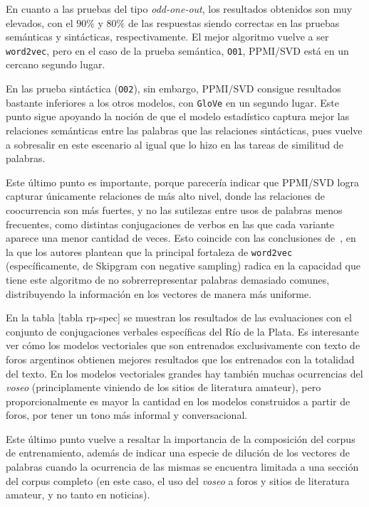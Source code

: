 En cuanto a las pruebas del tipo \textit{odd-one-out}, los resultados obtenidos son muy elevados,
con el $90\%$ y $80\%$ de las respuestas siendo correctas en las pruebas semánticas y sintácticas,
respectivamente. El mejor algoritmo vuelve a ser \texttt{word2vec}, pero en el caso de la prueba
semántica, \texttt{O01}, PPMI/SVD está en un cercano segundo lugar.

En las prueba sintáctica (\texttt{O02}), sin embargo, PPMI/SVD consigue resultados bastante
inferiores a los otros modelos, con \texttt{GloVe} en un segundo lugar. Este punto sigue apoyando la
noción de que el modelo estadístico captura mejor las relaciones semánticas entre las palabras que
las relaciones sintácticas, pues vuelve a sobresalir en este escenario al igual que lo hizo en las
tareas de similitud de palabras.

Este último punto es importante, porque parecería indicar que PPMI/SVD logra capturar únicamente
relaciones de más alto nivel, donde las relaciones de coocurrencia son más fuertes, y no las
sutilezas entre usos de palabras menos frecuentes, como distintas conjugaciones de verbos en las que
cada variante aparece una menor cantidad de veces. Esto coincide con las conclusiones
de~\cite{Levy2014a}, en la que los autores plantean que la principal fortaleza de \texttt{word2vec}
(específicamente, de Skipgram con negative sampling) radica en la capacidad que tiene este algoritmo
de no sobrerrepresentar palabras demasiado comunes, distribuyendo la información en los vectores de
manera más uniforme.


En la tabla [tabla rp-spec] se muestran los resultados de las evaluaciones con el conjunto de
conjugaciones verbales específicas del Río de la Plata. Es interesante ver cómo los modelos
vectoriales que son entrenados exclusivamente con texto de foros argentinos obtienen mejores
resultados que los entrenados con la totalidad del texto. En los modelos vectoriales grandes hay
también muchas ocurrencias del \textit{voseo} (principlamente viniendo de los sitios de literatura
amateur), pero proporcionalmente es mayor la cantidad en los modelos construidos a partir de foros,
por tener un tono más informal y conversacional.

Este último punto vuelve a resaltar la importancia de la composición del corpus de entrenamiento,
además de indicar una especie de dilución de los vectores de palabras cuando la ocurrencia de las
mismas se encuentra limitada a una sección del corpus completo (en este caso, el uso del
\textit{voseo} a foros y sitios de literatura amateur, y no tanto en noticias).

